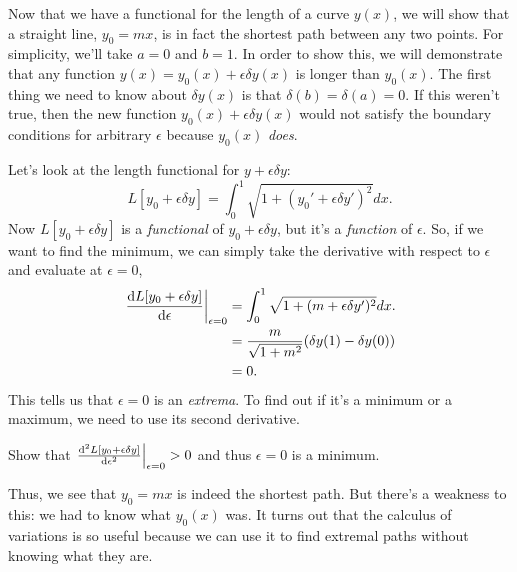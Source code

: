 Now that we have a functional for the length of a curve $y(x)$, we will show that a straight line, $y_0 = mx$, is in fact the shortest path between any two points. For simplicity, we'll take $a = 0$ and $b = 1$. In order to show this, we will demonstrate that any function $y(x) = y_0(x) + \epsilon \delta y(x)$ is longer than $y_0(x)$. The first thing we need to know about $\delta y(x)$ is that $\delta(b) = \delta(a) = 0$. If this weren't true, then the new function $y_0(x) + \epsilon \delta y(x)$ would not satisfy the boundary conditions for arbitrary $\epsilon$ because $y_0(x)$ \emph{does}.

Let's look at the length functional for $y + \epsilon \delta y$:
\begin{equation}
  \label{eq:line_perturb_length}
  L[y_0 + \epsilon \delta y] = \int_0^1 \sqrt{1 + (y_0' + \epsilon \delta y')^2 } dx.
\end{equation}
Now $L[y_0 + \epsilon \delta y]$ is a \emph{functional} of $y_0 + \epsilon \delta y$, but it's a \emph{function} of $\epsilon$. So, if we want to find the minimum, we can simply take the derivative with respect to $\epsilon$ and evaluate at $\epsilon = 0$,
\begin{equation}
  \begin{split}
    \label{eq:deriv_length}
    \eval{\dv{L[y_0 + \epsilon \delta y]}{\epsilon}}_{\epsilon=0} & = \int_0^1 \sqrt{1 + (m + \epsilon \delta y')^2 } dx.\\
    & = \frac{m}{\sqrt{1 + m^2}} \qty(\delta y(1) - \delta y(0))\\
    & = 0.\\
  \end{split}
\end{equation}
This tells us that $\epsilon = 0$ is an \emph{extrema}. To find out if it's a minimum or a maximum, we need to use its second derivative.
\begin{Exercise}
  Show that $\eval{\dv[2]{L[y_0 + \epsilon \delta y]}{\epsilon}}_{\epsilon = 0} > 0$ and thus $\epsilon = 0$ is a minimum.
\end{Exercise}

Thus, we see that $y_0 = mx$ is indeed the shortest path. But there's a weakness to this: we had to know what $y_0(x)$ was. It turns out that the calculus of variations is so useful because we can use it to find extremal paths without knowing what they are.

